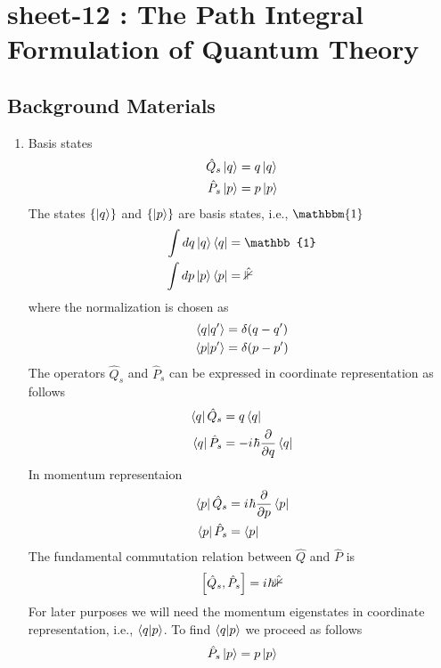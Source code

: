 \chapter{sheet-12 : The Path Integral Formulation of Quantum Theory}
\section{Background Materials}
\begin{enumerate}
	\item Basis states \\
	\begin{align}
		\hat{Q}_s \ket{q} &= q\ket{q} \\
		\hat{P}_s \ket{p} &= p\ket{p} 
	\end{align}
	The states $\{\ket{q}\}$ and $\{\ket{p}\}$ are basis states, i.e., $\mathbbm{1}$
	\begin{align}
		\int dq \ket{q}\bra{q} &= \mathbb{1} \\
		\int dp \ket{p}\bra{p} &= \mathbb{\hat{1}} \\
	\end{align}
	where the normalization is chosen as
	\begin{align}
		\braket{q}{q^\prime} &= \delta(q-q^\prime) \\
		\braket{p}{p^\prime} &= \delta(p-p^\prime) 
	\end{align}
	The operators $\hat{Q}_s$ and $\hat{P}_s$ can be expressed in coordinate representation as follows
	\begin{align}
		\bra{q}\hat{Q}_s &= q \bra{q} \\
		\bra{q}\hat{P}_s &= -{i\mkern1mu} \hbar \frac{\partial}{\partial q} \bra{q} 
	\end{align}
	In momentum representaion
	\begin{align}
		\bra{p}\hat{Q}_s &= {i\mkern1mu} \hbar \frac{\partial}{\partial p} \bra{p} \\
		\bra{p}\hat{P}_s &=  \bra{p} 
	\end{align}
	The fundamental commutation relation between $\hat{Q}$ and $\hat{P}$ is 
	\begin{equation}
		\left[\hat{Q}_s, \hat{P}_s\right] = {i\mkern1mu}
		 \hbar \mathbb{\hat{1}}
	\end{equation}
	For later purposes we will need the momentum eigenstates in coordinate representation, i.e., $\braket{q}{p}$. To find $\braket{q}{p}$ we proceed as follows
	\begin{align}
		\hat{P}_s \ket{p} &= p\ket{p} \\

\end{align}
\end{enumerate}
